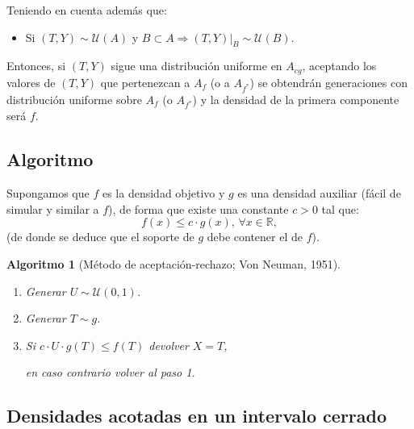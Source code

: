 \documentclass[
  10pt,
]{book}
\providecommand{\tightlist}{%
  \setlength{\itemsep}{0pt}\setlength{\parskip}{0pt}}
\theoremstyle{break}
\newtheorem{conjecture}{Algoritmo}[chapter]
\theoremstyle{nonumberplain}
\begin{document}
Teniendo en cuenta además que:

\begin{itemize}
\tightlist
\item
  Si \(\left( T,Y\right) \sim \mathcal{U}\left( A\right)\) y
  \(B \subset A\Rightarrow \left. \left( T,Y\right) \right\vert _{B} \sim \mathcal{U}\left(B\right)\).
\end{itemize}

Entonces, si \(\left( T, Y \right)\) sigue una distribución uniforme en \(A_{cg}\), aceptando los valores de \(\left( T, Y \right)\) que pertenezcan a \(A_{f}\) (o a \(A_{f^{\ast}}\)) se obtendrán generaciones con distribución uniforme sobre \(A_{f}\) (o \(A_{f^{\ast}}\)) y la densidad de la primera componente será \(f\).

\hypertarget{algoritmo}{%
\subsection{Algoritmo}\label{algoritmo}}

Supongamos que \(f\) es la densidad objetivo y \(g\) es una densidad
auxiliar (fácil de simular y similar a \(f\)), de forma que
existe una constante \(c>0\) tal que:
\[f(x) \leq c\cdot g(x) 
\text{, }\forall x\in \mathbb{R},\]
(de donde se deduce que el soporte de \(g\) debe contener el de \(f\)).

\begin{conjecture}[Método de aceptación-rechazo; Von Neuman, 1951]
\protect\hypertarget{cnj:aceptacion-rechazo}{}\label{cnj:aceptacion-rechazo}

\begin{enumerate}
\def\labelenumi{\arabic{enumi}.}
\item
  Generar \(U \sim \mathcal{U}(0, 1)\).
\item
  Generar \(T \sim g\).
\item
  Si \(c\cdot U\cdot g(T) \leq f(T)\)
  devolver \(X=T\),

  en caso contrario volver al paso 1.
\end{enumerate}

\end{conjecture}

\hypertarget{densidades-acotadas-en-un-intervalo-cerrado}{%
\subsection{Densidades acotadas en un intervalo cerrado}\label{densidades-acotadas-en-un-intervalo-cerrado}}
\end{document}

